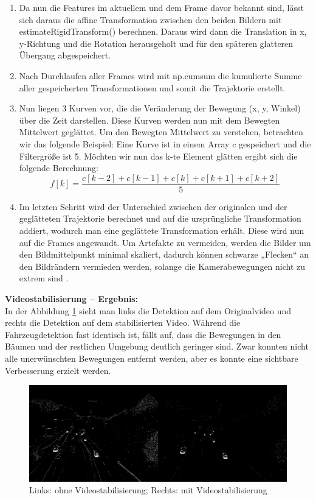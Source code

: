 \documentclass[conference]{IEEEtran}
\begin{document}
\begin{enumerate}
		\item Da nun die Features im aktuellem und dem Frame davor bekannt sind, lässt sich daraus die affine Transformation zwischen den beiden Bildern mit estimateRigidTransform() berechnen. Daraus wird dann die Translation in x, y-Richtung und die Rotation herausgeholt und für den späteren glatteren Übergang abgespeichert.
		
		\item Nach Durchlaufen aller Frames wird mit np.cumsum die kumulierte Summe aller gespeicherten Transformationen und somit die Trajektorie erstellt.
		
		\item Nun liegen 3 Kurven vor, die die Veränderung der Bewegung (x, y, Winkel) über die Zeit darstellen. Diese Kurven werden nun mit dem Bewegten Mittelwert geglättet. Um den Bewegten Mittelwert zu verstehen, betrachten wir das folgende Beispiel: 
		Eine Kurve ist in einem Array c gespeichert und die Filtergröße ist 5. Möchten wir nun das k-te Element glätten ergibt sich die folgende Berechnung:
		\[ f[k] = \frac{c[k-2]+c[k-1]+c[k]+c[k+1]+c[k+2]}{5} \]
		
		\item Im letzten Schritt wird der Unterschied zwischen der originalen und der geglätteten Trajektorie berechnet und auf die ursprüngliche Transformation addiert, wodurch man eine geglättete Transformation erhält. Diese wird nun auf die Frames angewandt. Um Artefakte zu vermeiden, werden die Bilder um den Bildmittelpunkt minimal skaliert, dadurch können schwarze „Flecken“ an den Bildrändern vermieden werden, solange die Kamerabewegungen nicht zu extrem sind \cite{s4}.
		
	\end{enumerate}
	\textbf{Videostabilisierung – Ergebnis:}\\
	In der Abbildung \ref{VS3} sieht man links die Detektion auf dem Originalvideo und rechts die Detektion auf dem stabilisierten Video. Während die Fahrzeugdetektion fast identisch ist, fällt auf, dass die Bewegungen in den Bäumen und der restlichen Umgebung deutlich geringer sind. Zwar konnten nicht alle unerwünschten Bewegungen entfernt werden, aber es konnte eine sichtbare Verbesserung erzielt werden.
	\begin{figure}[!h]
		\begin{center}
			\includegraphics[width=16cm]{Media/VideoStab3E.png}
			\caption{Links: ohne Videostabilisierung; Rechts: mit Videostabilisierung}
			\label{VS3}
		\end{center}
	\end{figure}\\
\end{document}
